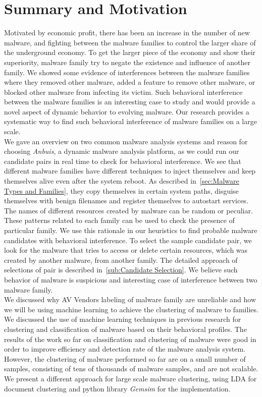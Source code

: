 \section{Summary and Motivation}
\label{sec:Motivation}
Motivated by economic profit, there has been an increase in the number of new malware, and fighting between the malware families to control the larger share of the underground economy.
To get the larger piece of the economy and show their superiority, malware family try to negate the existence and influence of another family.
We showed some evidence of interferences between the malware families where they removed other malware, added a feature to remove other malware, or blocked other malware from infecting its victim.
Such behavioral interference between the malware families is an interesting case to study and would provide a novel aspect of dynamic behavior to evolving malware.
Our research provides a systematic way to find such behavioral interference of malware families on a large scale.
\\
We gave an overview on two common malware analysis systems and reason for choosing \emph{Anbuis}, a dynamic malware analysis platform, as we could run our candidate pairs in real time to check for behavioral interference.
We see that different malware families have different techniques to inject themselves and keep themselves alive even after the system reboot.
As described in~\autoref{sec:Malware Types and Families}, they copy themselves in certain system paths, disguise themselves with benign filenames and register themselves to autostart services.
The names of different resources created by malware can be random or peculiar.
These patterns related to each family can be used to check the presence of particular family.
We use this rationale in our heuristics to find probable malware candidates with behavioral interference.
To select the sample candidate pair, we look for the malware that tries to access or delete certain resources, which was created by another malware, from another family.
The detailed approach of selections of pair is described in~\autoref{sub:Candidate Selection}.
We believe such behavior of malware is suspicious and interesting case of interference between two malware family.\\

We discussed why AV Vendors labeling of malware family are unreliable and how we will be using machine learning to achieve the clustering of malware to families.
We discussed the use of machine learning techniques in previous research for clustering and classification of malware based on their behavioral profiles.
The results of the work so far on classification and clustering of malware were good in order to improve efficiency and detection rate of the malware analysis system.
However, the clustering of malware performed so far are on a small number of samples, consisting of tens of thousands of malware samples, and are not scalable.
We present a different approach for large scale malware clustering, using LDA for document clustering and python library \emph{Gemsim} for the implementation.\\

